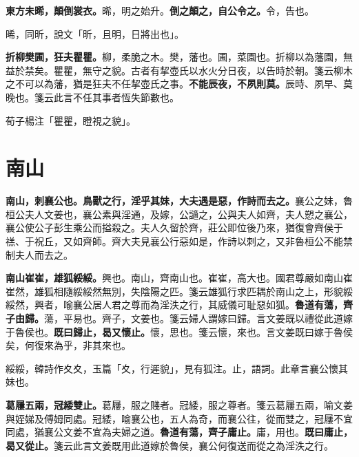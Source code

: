 \textbf{東方未晞，顛倒裳衣。}{\footnotesize 晞，明之始升。}\textbf{倒之顛之，自公令之。}{\footnotesize 令，告也。}

\begin{quoting}晞，同昕，說文「昕，且明，日將出也」。\end{quoting}

\textbf{折柳樊圃，狂夫瞿瞿。}{\footnotesize 柳，柔脆之木。樊，藩也。圃，菜園也。折柳以為藩園，無益於禁矣。瞿瞿，無守之貌。古者有挈壺氏以水火分日夜，以告時於朝。箋云柳木之不可以為藩，猶是狂夫不任挈壺氏之事。}\textbf{不能辰夜，不夙則莫。}{\footnotesize 辰時、夙早、莫晚也。箋云此言不任其事者恆失節數也。}

\begin{quoting}荀子楊注「瞿瞿，瞪視之貌」。\end{quoting}

\section{南山}


\textbf{南山，刺襄公也。鳥獸之行，淫乎其妹，大夫遇是惡，作詩而去之。}{\footnotesize 襄公之妹，魯桓公夫人文姜也，襄公素與淫通，及嫁，公讁之，公與夫人如齊，夫人愬之襄公，襄公使公子彭生乘公而搤殺之。夫人久留於齊，莊公即位後乃來，猶復會齊侯于禚、于祝丘，又如齊師。齊大夫見襄公行惡如是，作詩以刺之，又非魯桓公不能禁制夫人而去之。}

\textbf{南山崔崔，雄狐綏綏。}{\footnotesize 興也。南山，齊南山也。崔崔，高大也。國君尊嚴如南山崔崔然，雄狐相隨綏綏然無別，失陰陽之匹。箋云雄狐行求匹耦於南山之上，形貌綏綏然，興者，喻襄公居人君之尊而為淫泆之行，其威儀可耻惡如狐。}\textbf{魯道有蕩，齊子由歸。}{\footnotesize 蕩，平易也。齊子，文姜也。箋云婦人謂嫁曰歸。言文姜既以禮從此道嫁于魯侯也。}\textbf{既曰歸止，曷又懷止。}{\footnotesize 懷，思也。箋云懷，來也。言文姜既曰嫁于魯侯矣，何復來為乎，非其來也。}

\begin{quoting}綏綏，韓詩作夊夊，玉篇「夊，行遲貌」，見有狐注。止，語詞。此章言襄公懷其妹也。\end{quoting}

\textbf{葛屨五兩，冠緌雙止。}{\footnotesize 葛屨，服之賤者。冠緌，服之尊者。箋云葛屨五兩，喻文姜與姪娣及傅姆同處。冠緌，喻襄公也，五人為奇，而襄公往，從而雙之，冠屨不宜同處，猶襄公文姜不宜為夫婦之道。}\textbf{魯道有蕩，齊子庸止。}{\footnotesize 庸，用也。}\textbf{既曰庸止，曷又從止。}{\footnotesize 箋云此言文姜既用此道嫁於魯侯，襄公何復送而從之為淫泆之行。}

